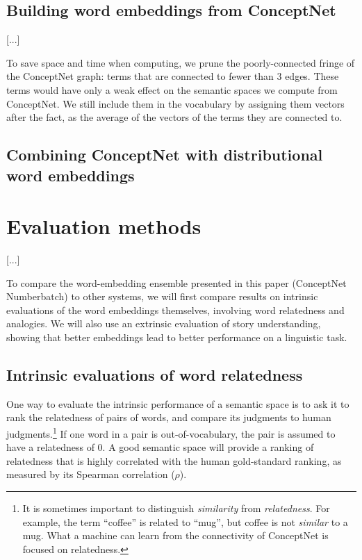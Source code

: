 \documentclass[letterpaper]{article}
\begin{document}
\subsection{Building word embeddings from ConceptNet}
\label{pruning}
[...] %

To save space and time when computing, we prune the poorly-connected fringe of
the ConceptNet graph: terms that are connected to fewer than 3 edges. These
terms would have only a weak effect on the semantic spaces we compute from
ConceptNet. We still include them in the vocabulary by assigning them vectors
after the fact, as the average of the vectors of the terms they are connected
to.

\subsection{Combining ConceptNet with distributional word embeddings}

\section{Evaluation methods}

[...]

To compare the word-embedding ensemble presented in this paper (ConceptNet
Numberbatch) to other systems, we will first compare results on intrinsic
evaluations of the word embeddings themselves, involving word relatedness and
analogies. We will also use an extrinsic evaluation of story understanding,
showing that better embeddings lead to better performance on a linguistic task.

\subsection{Intrinsic evaluations of word relatedness}
\label{intrinsic-evaluations}

One way to evaluate the intrinsic performance of a semantic space is to ask it
to rank the relatedness of pairs of words, and compare its judgments to human
judgments.\footnote{It is sometimes important to distinguish \emph{similarity}
from \emph{relatedness}. For example, the term ``coffee'' is related to
``mug'', but coffee is not \emph{similar} to a mug. What a machine can learn
from the connectivity of ConceptNet is focused on relatedness.} If one word in
a pair is out-of-vocabulary, the pair is assumed to have a relatedness of 0. A
good semantic space will provide a ranking of relatedness that is highly
correlated with the human gold-standard ranking, as measured by its Spearman
correlation ($\rho$).
\end{document}
